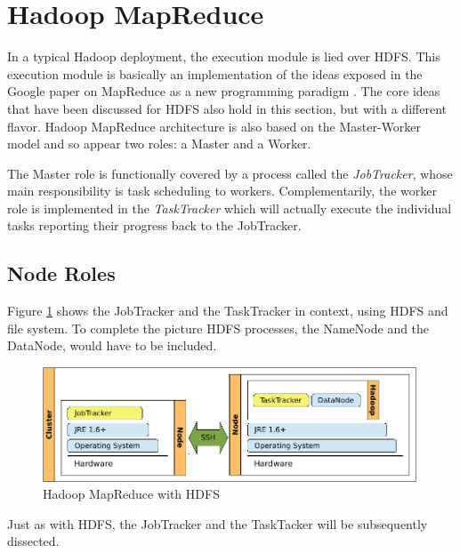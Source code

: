 \section{Hadoop MapReduce}\label{sec:hadoopmapred}
\noindent In a typical Hadoop deployment, the execution module is lied over HDFS. This execution module is basically an implementation of the ideas exposed in the Google paper on MapReduce as a new programming paradigm \cite{googlemapreduce}. The core ideas that have been discussed for HDFS also hold in this section, but with a different flavor. Hadoop MapReduce architecture is also based on the Master-Worker model and so appear two roles: a Master and a Worker.

The Master role is functionally covered by a process called the \emph{JobTracker}, whose main responsibility is task scheduling to workers. Complementarily, the worker role is implemented in the \emph{TaskTracker} which will actually execute the individual tasks reporting their progress back to the JobTracker.

\subsection{Node Roles}\label{subsec:rolesnodosmapred}
\noindent Figure \ref{fig:desplieguehadoopmapred} shows the JobTracker and the TaskTracker in context, using HDFS and file system. To complete the picture HDFS processes, the NameNode and the DataNode, would have to be included.

\begin{figure}[tbp]
\begin{center}
\includegraphics[width=0.99\textwidth]{imagenes/020.pdf}
 \caption{Hadoop MapReduce with HDFS}
\label{fig:desplieguehadoopmapred}
\end{center}
\end{figure}

Just as with HDFS, the JobTracker and the TaskTacker will be subsequently dissected.

